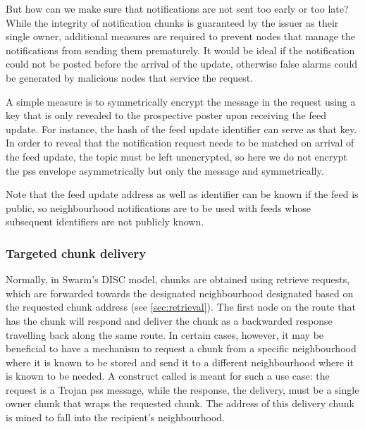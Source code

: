 But how can we make sure that notifications are not sent too early or too late? While the integrity of notification chunks is guaranteed by the issuer as their single owner, additional measures are required to prevent nodes that manage the notifications from sending them prematurely. It would be ideal if the notification could not be posted before the arrival of the update, otherwise false alarms could be generated by malicious nodes that service the request.

A simple measure is to symmetrically encrypt the message in the request using a key that is only revealed to the prospective poster upon receiving the feed update. For instance, the hash of the feed update identifier can serve as that key.
In order to reveal that the notification request needs to be matched on arrival of the feed update, the topic must be left unencrypted, so here we do not encrypt the pss envelope asymmetrically but only the message and symmetrically.

Note that the feed update address as well as identifier can be known if the feed is public, so neighbourhood notifications are to be used with feeds whose subsequent identifiers are not publicly known.

\subsubsection{Targeted chunk delivery}

Normally, in Swarm's DISC model, chunks are obtained using retrieve requests, which are forwarded towards the designated neighbourhood designated based on the requested chunk address (see \ref{sec:retrieval}). The first node on the route that has the chunk will respond and deliver the chunk as a backwarded response travelling back along the same route. In certain cases, however, it may be beneficial to have a mechanism to request a chunk from a specific neighbourhood where it is known to be stored and send it to a different neighbourhood where it is known to be needed. A construct called  is meant for such a use case: the request is a Trojan pss message, while the response, the delivery, must be a single owner chunk that wraps the requested chunk. The address of this delivery chunk is mined to fall into the recipient's neighbourhood.  


